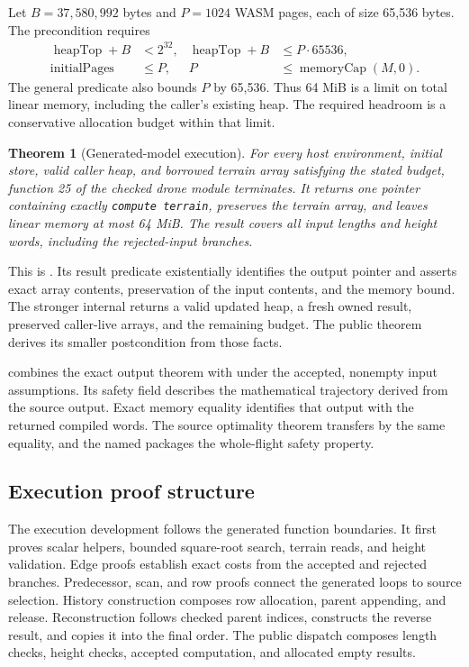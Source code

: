 \documentclass[11pt]{article}
\newtheorem{theorem}{Theorem}
\begin{document}
Let $B=37{,}580{,}992$ bytes and $P=1024$ WASM pages, each of size 65,536 bytes.  The  precondition requires
\begin{align*}
 \operatorname{heapTop}+B&<2^{32},&
 \operatorname{heapTop}+B&\leq P\cdot65536,\\
 \operatorname{initialPages}&\leq P,&
 P&\leq\operatorname{memoryCap}(M,0).
\end{align*}
The general predicate also bounds $P$ by 65,536.  Thus 64 MiB is a limit on total linear memory, including the caller's existing heap.  The required headroom is a conservative allocation budget within that limit.

\begin{theorem}[Generated-model execution]
For every host environment, initial store, valid caller heap, and borrowed terrain array satisfying the stated budget, function 25 of the checked drone module terminates.  It returns one pointer containing exactly \textup{\texttt{compute terrain}}, preserves the terrain array, and leaves linear memory at most 64 MiB.  The result covers all input lengths and height words, including the rejected-input branches.
\end{theorem}

This is .  Its result predicate  existentially identifies the output pointer and asserts exact array contents, preservation of the input contents, and the memory bound.  The stronger internal  returns a valid updated heap, a fresh owned result, preserved caller-live arrays, and the remaining budget.  The public theorem derives its smaller postcondition from those facts.

 combines the exact output theorem with  under the accepted, nonempty input assumptions.  Its safety field describes the mathematical trajectory derived from the source output.  Exact memory equality identifies that output with the returned compiled words.  The source optimality theorem transfers by the same equality, and the named  packages the whole-flight safety property.

\subsection{Execution proof structure}

The execution development follows the generated function boundaries.  It first proves scalar helpers, bounded square-root search, terrain reads, and height validation.  Edge proofs establish exact costs from the accepted and rejected branches.  Predecessor, scan, and row proofs connect the generated loops to source selection.  History construction composes row allocation, parent appending, and release.  Reconstruction follows checked parent indices, constructs the reverse result, and copies it into the final order.  The public dispatch composes length checks, height checks, accepted computation, and allocated empty results.
\end{document}
